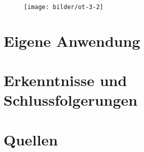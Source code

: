   
  \begin{frame}
    \begin{figure}[ht]
      \centering	      
      \texttt{[image: bilder/ot-3-2]}
      \label{gccpy2}
    \end{figure}
  \end{frame}
    
    
    \section{Eigene Anwendung}
    
    \section{Erkenntnisse und Schlussfolgerungen}
    
    \section{Quellen}
    
    
    
    


